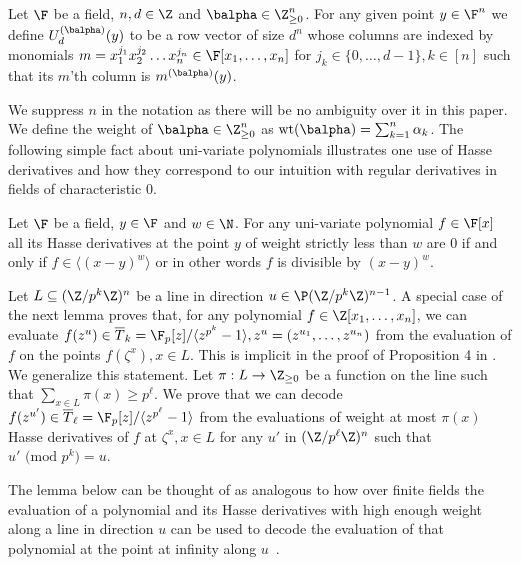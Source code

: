 \begin{define}
Let $\F$ be a field, $n,d\in \Z$ and $\balpha\in \Z_{\ge 0}^n$. For any given point $y\in \F^n$ we define $U_d^{(\balpha)}(y)$ to be a row vector of size $d^n$ whose columns are indexed by monomials $m=x_1^{j_1}x_2^{j_2}\hdots x_n^{j_n}\in \F[x_1,\hdots,x_n]$ for $j_k\in \{0,\hdots,d-1\},k\in [n]$ such that its $m$'th column is $m^{(\balpha)}(y)$. 
\end{define}

We suppress $n$ in the notation as there will be no ambiguity over it in this paper. We define the weight of $\balpha\in \Z_{\ge 0}^n$ as  $\text{wt}(\balpha)=\sum_{k=1}^n \alpha_k$. The following simple fact about uni-variate polynomials illustrates one use of Hasse derivatives and how they correspond to our intuition with regular derivatives in fields of characteristic $0$.

\begin{lem}\label{fact:Hasse}
Let $\F$ be a field, $y\in \F$ and $w\in \N$. For any uni-variate polynomial $f\in\F[x]$ all its Hasse derivatives at the point $y$ of weight strictly less than $w$ are $0$ if and only if $f\in \langle (x-y)^w\rangle$ or in other words $f$ is divisible by $(x-y)^w$.
\end{lem}

Let $L\subseteq (\Z/p^k\Z)^n$ be a line in direction $u\in \P (\Z/p^k\Z)^{n-1}$. A special case of the next lemma proves that, for any polynomial $f\in \Z[x_1,\hdots,x_n]$, we can evaluate $f(z^{u})\in \overline{T}_k=\F_p[z]/\langle z^{p^k}-1\rangle,z^{u}=(z^{u_1},\hdots,z^{u_n})$ from the evaluation of $f$ on the points $f(\zeta^x),x\in L$. This is implicit in the proof of Proposition 4 in \cite{arsovski2021padic}. We generalize this statement. Let $\pi: L \rightarrow \Z_{\ge 0}$ be a function on the line such that $\sum_{x\in L}\pi(x)\ge p^\ell$. We prove that we can decode $f(z^{u'})\in \overline{T}_{\ell}=\F_p[z]/\langle z^{p^\ell}-1\rangle$ from the evaluations of weight at most $\pi(x)$ Hasse derivatives of $f$ at $\zeta^x,x\in L$ for any $u'$ in $(\Z/p^\ell\Z)^n$ such that $u'\text{ (mod }p^k\text{)}=u$.

The lemma below can be thought of as analogous to how over finite fields the evaluation of a polynomial and its Hasse derivatives with high enough weight along a line in direction $u$ can be used to decode the evaluation of that polynomial at the point at infinity along $u$~\cite{dvir2013extensions}.

